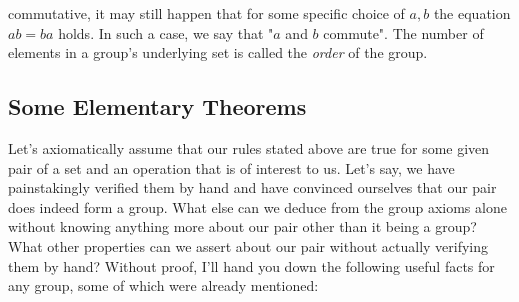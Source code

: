 commutative, it may still happen that for some specific choice of $a,b$ the equation $a b = b a$ holds. In such a case, we say that "$a$ and $b$ commute". The number of elements in a group's underlying set is called the \emph{order} of the group.





\subsection{Some Elementary Theorems}
Let's axiomatically assume that our rules stated above are true for some given pair of a set and an operation that is of interest to us. Let's say, we have painstakingly verified them by hand and have convinced ourselves that our pair does indeed form a group. What else can we deduce from the group axioms alone without knowing anything more about our pair other than it being a group? What other properties can we assert about our pair without actually verifying them by hand? Without proof, I'll hand you down the following useful facts for any group, some of which were already mentioned: 
